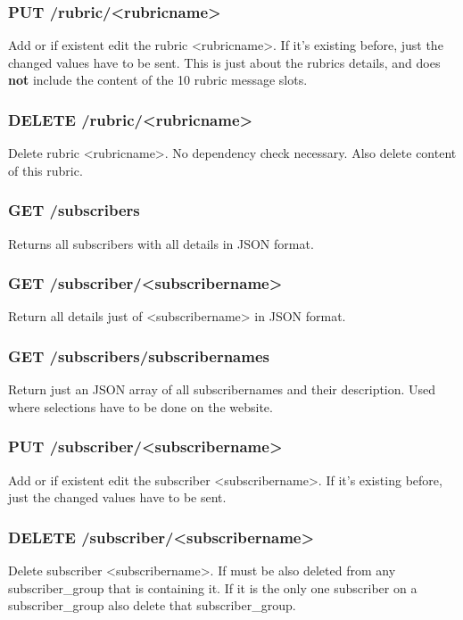 \subsubsection{PUT /rubric/<rubricname>}
Add or if existent edit the rubric <rubricname>. If it's existing before, just the changed values have to be sent. This is just about the rubrics details, and does \textbf{not} include the content of the 10 rubric message slots.

\subsubsection{DELETE /rubric/<rubricname>}
Delete rubric <rubricname>. No dependency check necessary. Also delete content of this rubric.

\subsubsection{GET /subscribers}
Returns all subscribers with all details in JSON format.

\subsubsection{GET /subscriber/<subscribername>}
Return all details just of <subscribername> in JSON format.

\subsubsection{GET /subscribers/subscribernames}
Return just an JSON array of all subscribernames and their description. Used where selections have to be done on the website.

\subsubsection{PUT /subscriber/<subscribername>}
Add or if existent edit the subscriber <subscribername>. If it's existing before, just the changed values have to be sent.

\subsubsection{DELETE /subscriber/<subscribername>}
Delete subscriber <subscribername>. If must be also deleted from any subscriber\_group that is containing it. If it is the only one subscriber on a subscriber\_group also delete that subscriber\_group.

